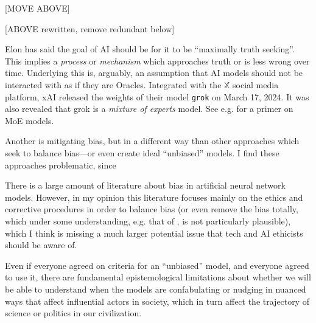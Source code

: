 \documentclass[11pt, oneside]{article}   	%
\begin{document}
[MOVE ABOVE]






[ABOVE rewritten, remove redundant below]




Elon has said the goal of AI should be for it to be ``maximally truth seeking''.  This implies a \emph{process} or \emph{mechanism} which approaches truth or is less wrong over time.  Underlying this is, arguably, an assumption that AI models should not be interacted with as if they are Oracles.  Integrated with the $\mathbb{X}$ social media platform, xAI released the weights of their model \texttt{grok} on March 17, 2024.  It was also revealed that grok is a \emph{mixture of experts} model.  See e.g. \citep{HFMOE} for a primer on MoE models.

Another is mitigating bias, but in a different way than other approaches which seek to balance bias---or even create ideal ``unbiased'' models.  I find these approaches problematic, since 

There is a large amount of literature about bias in artificial neural network models.  However, in my opinion this literature focuses mainly on the ethics and corrective procedures in order to balance bias (or even remove the bias totally, which under some  understanding, e.g. that of \citep{Mitchell1980}, is not particularly plausible), which I think is missing a much larger potential issue that tech and AI ethicists should be aware of.  

Even if everyone agreed on criteria for an ``unbiased'' model, and everyone agreed to use it, there are fundamental epistemological limitations about whether we will be able to understand when the models are confabulating or nudging in nuanced ways that affect influential actors in society, which in turn affect the trajectory of science or politics in our civilization.
\end{document}
